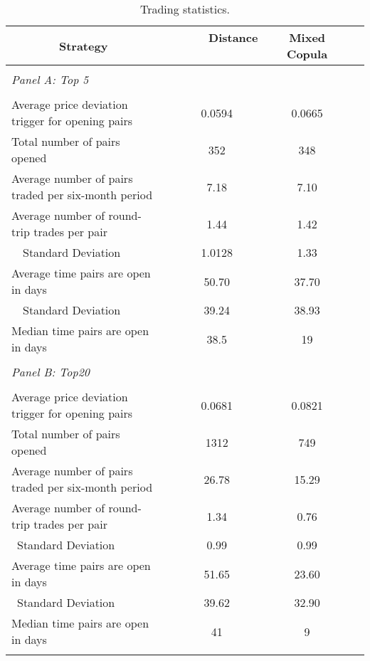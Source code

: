 \documentclass[titlepage]{elsarticle}
\begin{document}
		
\setcounter{table}{1}

	\begin{table}[!http]
		\centering
		\caption{Trading statistics.}
		\begin{tabular}{lcccc}
			\toprule
			\multicolumn{1}{c}{Strategy} & \ \ \ \ \ Distance \ \ \ \ \ \ & Mixed Copula \\
			\midrule
			&&\vspace{-.3cm}\\
			 \multicolumn{1}{l}{\textit{Panel A: Top 5}} \\
			&&\vspace{-.3cm}\\
			Average price deviation trigger for opening pairs & 0.0594 & 0.0665  \\
			Total number of pairs opened &  352   &  348   \\
			Average number of pairs traded per six-month period & 7.18 & 7.10    \\
			Average number of round-trip trades per pair & 1.44 & 1.42   \\
			~~Standard Deviation & 1.0128 & 1.33   \\
			Average time pairs are open in days &  50.70 &  37.70  \\
			~~Standard Deviation & 39.24 & 38.93    \\
			Median time pairs are open in days &  38.5  &  19          \\
			&&\vspace{0cm}\\
			 \multicolumn{1}{l}{\textit{Panel B: Top20}} \\
			&&\vspace{-.3cm}\\
			Average price deviation trigger for opening pairs & 0.0681 & 0.0821    \\
			Total number of pairs opened &  1312  &  749     \\
			Average number of pairs traded per six-month period & 26.78 & 15.29   \\
			Average number of round-trip trades per pair & 1.34 & 0.76  \\
			~Standard Deviation & 0.99 & 0.99    \\
			Average time pairs are open in days & 51.65 & 23.60   \\
			~Standard Deviation & 39.62 & 32.90    \\
			Median time pairs are open in days & 41    & 9           \\
			& & \\

\end{tabular}
\end{table}
\end{document}
